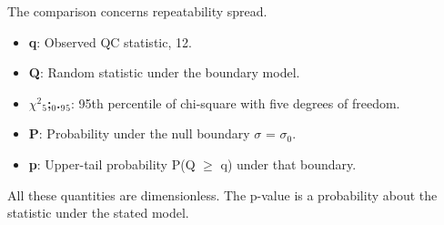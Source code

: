 \documentclass[11pt,a4paper]{article}
\begin{document}
\begin{minipage}{\linewidth}
The comparison concerns repeatability spread.

\begin{itemize}\setlength{\itemsep}{1pt}\setlength{\parsep}{0pt}
\item \textbf{q}: Observed QC statistic, 12.
\item \textbf{Q}: Random statistic under the boundary model.
\item \textbf{\ensuremath{\chi}\ensuremath{{}^2}\ensuremath{{}_5};\ensuremath{{}_0}.\ensuremath{{}_9}\ensuremath{{}_5}}: 95th percentile of chi-square with five degrees of freedom.
\item \textbf{P}: Probability under the null boundary \ensuremath{\sigma} = \ensuremath{\sigma}\ensuremath{{}_0}.
\item \textbf{p}: Upper-tail probability P(Q \ensuremath{\ge} q) under that boundary.
\end{itemize}

All these quantities are dimensionless. The p-value is a probability about the statistic under the stated model.

\end{minipage}\par
\medskip
\end{document}
